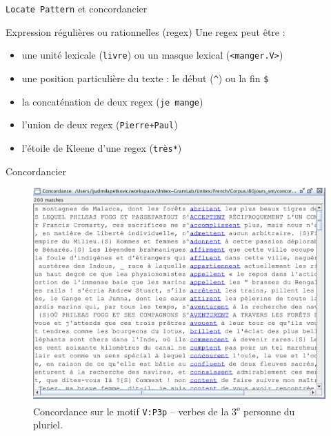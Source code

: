 \documentclass[xetex,xcolor={table,usenames,dvipsnames}]{beamer}
\begin{document}
\begin{frame}{\texttt{Locate Pattern} et concordancier}
\end{frame}

\begin{frame}{Expression régulières ou rationnelles (regex)}
	Une regex peut être :
	\begin{itemize}
		\item une \textcolor{deepblue}{unité lexicale} (\texttt{livre}) ou un masque lexical (\texttt{<manger.V>})
		\item une \textcolor{deepblue}{position} particulière du texte : le début (\texttt{\^}) ou la fin \texttt{\$}
		\item la \textcolor{deepblue}{concaténation} de deux regex (\texttt{je mange})
		\item l'\textcolor{deepblue}{union} de deux regex (\texttt{Pierre+Paul})
		\item l'\textcolor{deepblue}{étoile de Kleene} d'une regex (\texttt{très*})
	\end{itemize}
\end{frame}

\begin{frame}{Concordancier}
			\begin{figure}[h] %
		\centering
		\includegraphics[width=0.8\linewidth]{img/concordance.png}
		\caption{Concordance sur le motif \texttt{V:P3p} -- verbes de la 3\textsuperscript{e} personne du pluriel.}
		\label{fig:ling_out_TAL}
	\end{figure}
\end{frame}
\end{document}
